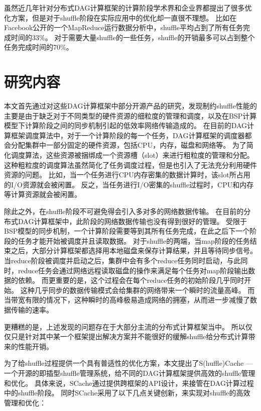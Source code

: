 虽然近几年针对分布式DAG计算框架的计算阶段学术界和企业界都提出了很多优化方案\cite{pacman, babu, quincy, sync}，但是对于shuffle阶段在实际应用中的优化却一直很不理想。
比如在Facebook公开的一个MapReduce运行数据分析中，shuffle平均占到了所有任务完成时间的33\%。
对于需要大量shuffle的一些任务，shuffle的开销最多可以占到整个任务完成时间的70\%\cite{managing}。



\section{研究内容}

本文首先通过对这些DAG计算框架中部分开源产品的研究，发现制约shuffle性能的主要是由于缺乏对于不同类型的硬件资源的细粒度的管理和调度，以及在BSP计算模型下计算阶段之间的同步机制引起的低效率网络传输造成的。
在目前的DAG计算框架调度算法中，对于一个计算阶段的每一个任务，DAG计算框架的调度器都会分配集群中一部分固定的硬件资源，包括CPU，内存，磁盘和网络等。
为了简化调度算法，这些资源被捆绑成一个资源槽（slot）来进行粗粒度的管理和分配。
这种粗粒度的调度算法虽然简化了任务调度过程，但是也引入了无法充分利用硬件资源的问题。
比如，当一个任务进行CPU内存密集的数据计算时，该slot所占用的I/O资源就会被闲置。
反之，当任务进行I/O密集的shuffle过程时，CPU和内存等计算资源就会被闲置。

除此之外，在shuffle阶段不可避免得会引入多对多的网络数据传输。
在目前的分布式DAG计算框架中，此阶段的网络数据传输也没有得到很好的管理。
受限于BSP模型的同步机制，一个计算阶段需要等到其所有任务完成，在此之后下一个阶段的任务才能开始被调度并且读取数据。
对于shuffle的两端，当map阶段的任务结束之后，大部分计算框架都选择用本地磁盘来保存计算结果，并且等待同步信号。
当reduce阶段被调度并启动之后，集群中会有多个reduce任务同时启动，与此同时，reduce任务会通过网络远程读取磁盘的操作来满足每个任务对map阶段输出数据的依赖。
而更重要的是，这个过程会在每个reduce任务的初始阶段几乎同时开始。
这种几乎同步的数据传输模式会给集群的网络带来一个瞬时的流量高峰。
而当带宽有限的情况下，这种瞬时的高峰极易造成网络的拥塞，从而进一步减慢了数据传输的速率。

更糟糕的是，上述发现的问题存在于大部分主流的分布式计算框架当中。
所以仅仅只是针对其中某一个框架提出解决方案并不能很好的缓解shuffle给分布式计算带来的性能开销。

为了给shuffle过程提供一个具有普适性的优化方案，本文提出了S(huffle)Cache --- 一个开源的即插型shuffle管理系统，给不同的DAG计算框架提供高效的shuffle管理和优化。
具体来说，SCache通过提供跨框架的API设计，来接管在DAG计算过程中的shuffle阶段。
同时SCache采用了以下几点关键创新，来实现对shuffle的高效管理和优化：

